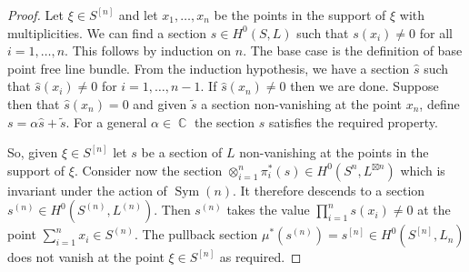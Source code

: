 \documentclass[10pt,a4paper]{amsart}
\DeclareMathOperator{\Sym}{Sym}
\DeclareMathOperator{\bC}{\mathbb{C}}
\newcommand{\hilb}[2][n]{#2^{[#1]}}
\newcommand{\sym}[2][n]{#2^{(#1)}}
\begin{document}
\begin{proof}
Let $\xi\in\hilb{S}$ and let $x_1,\dots,x_n$ be the points in the support of $\xi$ with multiplicities. We can find a section $s\in H^0(S,L)$ such that $s(x_i)\neq 0$ for all $i=1,\dots,n.$ This follows by induction on $n$. The base case is the definition of base point free line bundle. From the induction hypothesis, we have a section $\hat{s}$ such that $\hat{s}(x_i)\neq 0$ for $i=1,\dots,n-1$. If $\hat{s}(x_n)\neq 0$ then we are done. Suppose then that $\hat{s}(x_n)= 0$ and given $\tilde{s}$ a section non-vanishing at the point $x_n$, define $s=\alpha \hat{s}+\tilde{s}$. For a general $\alpha\in\bC$ the section $s$ satisfies the required property.

So, given $\xi\in\hilb{S}$ let $s$ be a section of $L$ non-vanishing at the points in the support of $\xi$. Consider now the section $\otimes_{i=1}^n\pi_i^*(s)\in H^0(S^n,L^{\boxtimes n})$ which is invariant under the action of $\Sym(n)$. It therefore descends to a section $\sym{s}\in H^0(\sym{S},\sym{L})$. Then $\sym{s}$ takes the value $\prod_{i=1}^ns(x_i)\neq0$ at the point $\sum_{i=1}^nx_i\in\sym{S}$. The pullback section $\mu^*(\sym{s})=\hilb{s}\in H^0(\hilb{S},L_n)$ does not vanish at the point $\xi\in\hilb{S}$ as required.

\end{proof}
\end{document}
